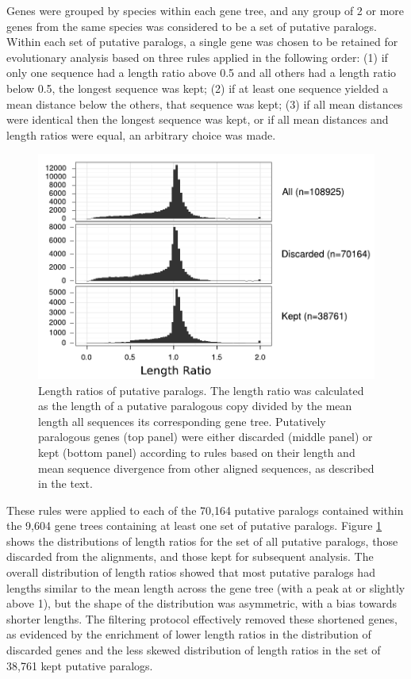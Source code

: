 Genes were grouped by species within each gene tree, and any group of
2 or more genes from the same species was considered to be a set of
putative paralogs. Within each set of putative paralogs, a single gene
was chosen to be retained for evolutionary analysis based on three
rules applied in the following order: (1) if only one sequence had a
length ratio above 0.5 and all others had a length ratio below 0.5,
the longest sequence was kept; (2) if at least one sequence yielded a
mean distance below the others, that sequence was kept; (3) if all
mean distances were identical then the longest sequence was kept, or
if all mean distances and length ratios were equal, an arbitrary
choice was made.

\begin{figure}
\centering
\includegraphics[scale=0.9]{Figs/mammals_paralogs_hist.pdf}
\caption{Length ratios of putative paralogs. The length ratio was
  calculated as the length of a putative paralogous copy divided by
  the mean length all sequences its corresponding gene
  tree. Putatively paralogous genes (top panel) were either discarded
  (middle panel) or kept (bottom panel) according to rules based on
  their length and mean sequence divergence from other aligned
  sequences, as described in the text.}
\label{filtered_paralogs_hist}
\end{figure}

These rules were applied to each of the 70,164 putative paralogs
contained within the 9,604 gene trees containing at least one set of
putative paralogs. Figure \ref{filtered_paralogs_hist} shows the
distributions of length ratios for the set of all putative paralogs,
those discarded from the alignments, and those kept for subsequent
analysis. The overall distribution of length ratios showed that most
putative paralogs had lengths similar to the mean length across the
gene tree (with a peak at or slightly above 1), but the shape of the
distribution was asymmetric, with a bias towards shorter lengths. The
filtering protocol effectively removed these shortened genes, as
evidenced by the enrichment of lower length ratios in the distribution
of discarded genes and the less skewed distribution of length ratios
in the set of 38,761 kept putative paralogs.

